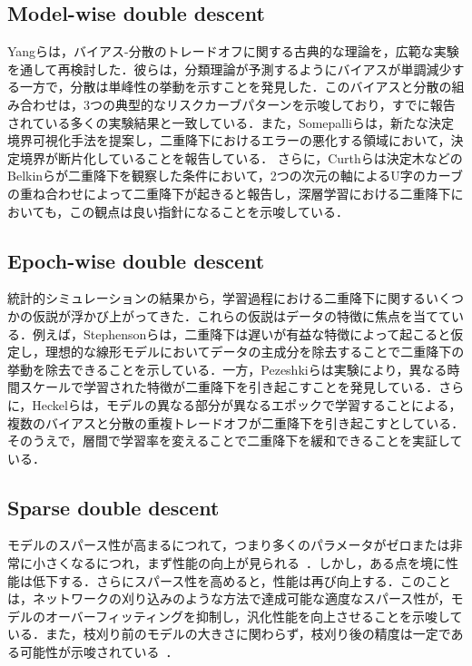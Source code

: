 \subsection{Model-wise double descent}
Yangらは，バイアス-分散のトレードオフに関する古典的な理論を，広範な実験を通して再検討した\cite{Yang}．彼らは，分類理論が予測するようにバイアスが単調減少する一方で，分散は単峰性の挙動を示すことを発見した．このバイアスと分散の組み合わせは，3つの典型的なリスクカーブパターンを示唆しており，すでに報告されている多くの実験結果と一致している．また，Somepalliらは，新たな決定境界可視化手法を提案し，二重降下におけるエラーの悪化する領域において，決定境界が断片化していることを報告している\cite{Somepalli}．
さらに，Curthらは決定木などのBelkinらが二重降下を観察した条件において，2つの次元の軸によるU字のカーブの重ね合わせによって二重降下が起きると報告し，深層学習における二重降下においても，この観点は良い指針になることを示唆している\cite{Curth_NeurIPS2023}．

\subsection{Epoch-wise double descent}
統計的シミュレーションの結果から，学習過程における二重降下に関するいくつかの仮説が浮かび上がってきた．これらの仮説はデータの特徴に焦点を当てている．例えば，Stephensonらは，二重降下は遅いが有益な特徴によって起こると仮定し，理想的な線形モデルにおいてデータの主成分を除去することで二重降下の挙動を除去できることを示している\cite{Stephenson}．一方，Pezeshkiらは実験により，異なる時間スケールで学習された特徴が二重降下を引き起こすことを発見している\cite{Pezeshki}．さらに，Heckelらは，モデルの異なる部分が異なるエポックで学習することによる，複数のバイアスと分散の重複トレードオフが二重降下を引き起こすとしている\cite{Heckel}．そのうえで，層間で学習率を変えることで二重降下を緩和できることを実証している．

\subsection{Sparse double descent}
モデルのスパース性が高まるにつれて，つまり多くのパラメータがゼロまたは非常に小さくなるにつれ，まず性能の向上が見られる~\cite{He, SDD_VIT}．しかし，ある点を境に性能は低下する．さらにスパース性を高めると，性能は再び向上する．このことは，ネットワークの刈り込みのような方法で達成可能な適度なスパース性が，モデルのオーバーフィッティングを抑制し，汎化性能を向上させることを示唆している．また，枝刈り前のモデルの大きさに関わらず，枝刈り後の精度は一定である可能性が示唆されている~\cite{Arora_SDD}．

